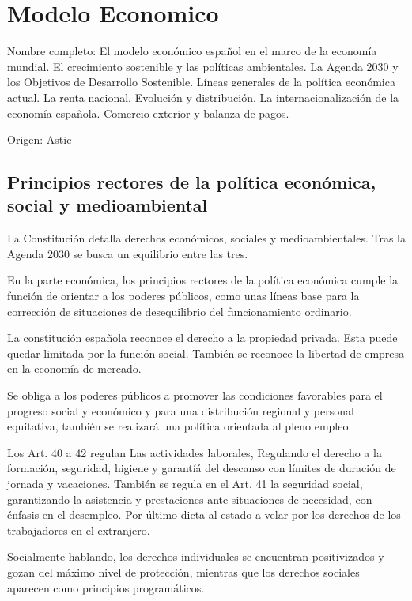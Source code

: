 \setcounter{section}{13}
\section{Modelo Economico}

Nombre completo: El modelo económico español en el marco de la economía mundial. El crecimiento sostenible y las políticas ambientales. La Agenda 2030 y los Objetivos de Desarrollo Sostenible. Líneas generales de la política económica actual. La renta nacional. Evolución y distribución. La internacionalización de la economía española. Comercio exterior y balanza de pagos.

Origen: Astic
\noindent{}

\localtableofcontents

\subsection{Principios rectores de la política económica, social y medioambiental} %
    La Constitución detalla derechos económicos, sociales y medioambientales. Tras la Agenda 2030 se busca un equilibrio entre las tres.

    En la parte económica, los principios rectores de la política económica cumple la función de orientar a los poderes públicos, como unas líneas base para la corrección de situaciones de desequilibrio del funcionamiento ordinario.

    La constitución española reconoce el derecho a la propiedad privada. Esta puede quedar limitada por la función social. También se reconoce la libertad de empresa en la economía de mercado.

    Se obliga a los poderes públicos a promover las condiciones favorables para el progreso social y económico y para una distribución regional y personal equitativa, también se realizará una política orientada al pleno empleo.

    Los Art. 40 a 42  regulan Las actividades laborales, Regulando el derecho a la formación, seguridad, higiene y garantíá del descanso con límites de duración de jornada y vacaciones. También se regula en el Art. 41 la seguridad social, garantizando la asistencia y prestaciones ante situaciones de necesidad, con énfasis en el desempleo. Por último dicta al estado a velar por los derechos de los trabajadores en el extranjero.

    Socialmente hablando, los derechos individuales se encuentran positivizados y gozan del máximo nivel de protección, mientras que los derechos sociales aparecen como principios programáticos.

